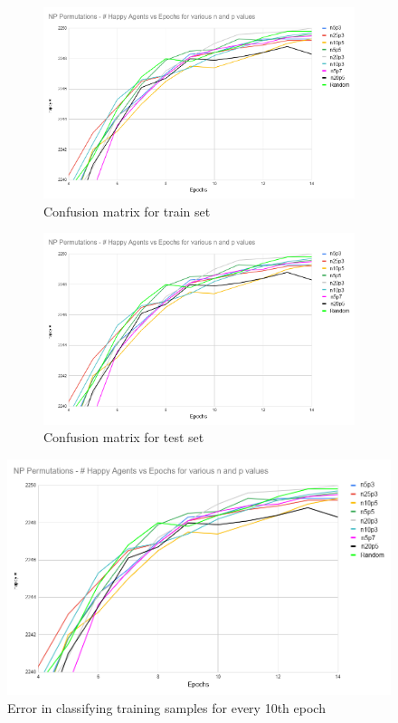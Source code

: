 \documentclass[a4paper,12pt]{article}
\begin{document}
  \begin{figure}[ht]
    \centering
    \begin{subfigure}[b]{0.49\linewidth}
      \includegraphics[width=\linewidth]{socialPermutations.PNG}
      \caption{Confusion matrix for train set}
      \label{fig:1.1a}
    \end{subfigure}
    \begin{subfigure}[b]{0.49\linewidth}
      \includegraphics[width=\linewidth]{socialPermutations.PNG}
      \caption{Confusion matrix for test set}
      \label{fig:1.1b}
    \end{subfigure}
    \caption{}
  \end{figure}
  \begin{figure}[ht]
    \centering
    \includegraphics[width=0.5\linewidth]{socialPermutations.PNG}
    \caption{Error in classifying training samples for every 10th epoch}
    \label{fig:1.2}
  \end{figure}
\end{document}
